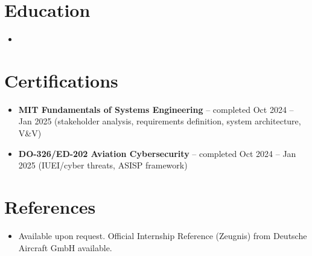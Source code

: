 \documentclass[11pt,a4paper,sans]{moderncv}
\begin{document}
\section{Education}
\vspace{1pt}
\begin{itemize}

\item{}

\end{itemize}


\section{Certifications}
\vspace{1pt}
\begin{itemize}
\item{\textbf{MIT Fundamentals of Systems Engineering} -- completed Oct 2024 -- Jan 2025 (stakeholder analysis, requirements definition, system architecture, V\&V)}
\item{\textbf{DO-326/ED-202 Aviation Cybersecurity} -- completed Oct 2024 -- Jan 2025 (IUEI/cyber threats, ASISP framework)}
\end{itemize}


\section{References}
\vspace{1pt}
\begin{itemize}
\item{Available upon request. Official Internship Reference (Zeugnis) from Deutsche Aircraft GmbH available.}
\end{itemize}
\end{document}
